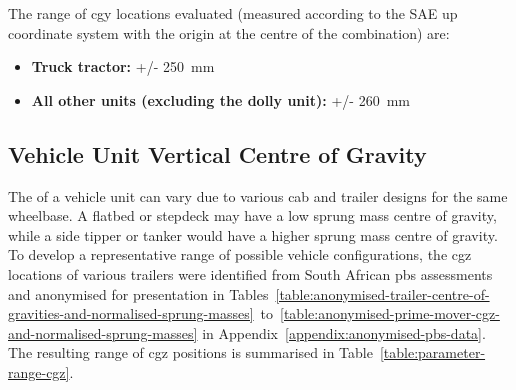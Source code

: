 The range of \gls{cgy} locations evaluated (measured according to the SAE up coordinate system with the origin at the centre of the combination) are:

\begin{itemize}
	\item \textbf{Truck tractor:} +/- 250~mm
	\item \textbf{All other units (excluding the dolly unit):} +/- 260~mm
\end{itemize}

\subsection{Vehicle Unit Vertical Centre of Gravity}\label{section:pr-cgz-vehicle-units}
The  of a vehicle unit can vary due to various cab and trailer designs for the same wheelbase. A flatbed or stepdeck may have a low sprung mass centre of gravity, while a side tipper or tanker would have a higher sprung mass centre of gravity. To develop a representative range of possible vehicle configurations, the \gls{cgz} locations of various trailers were identified from South African \gls{pbs} assessments and anonymised for presentation in Tables~\ref{table:anonymised-trailer-centre-of-gravities-and-normalised-sprung-masses}~to~\ref{table:anonymised-prime-mover-cgz-and-normalised-sprung-masses} in Appendix~\ref{appendix:anonymised-pbs-data}. The resulting range of \gls{cgz} positions is summarised in Table~\ref{table:parameter-range-cgz}.

